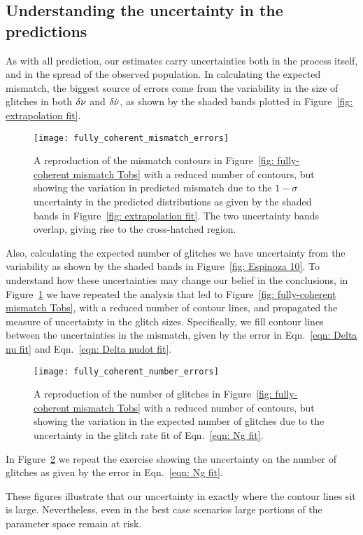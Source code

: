 \documentclass[../full_thesis/full_thesis.tex]{subfiles}
\begin{document}
\begin{subappendices}
\section{Understanding the uncertainty in the predictions}
\label{sec: uncertainties}

As with all prediction, our estimates carry uncertainties both in the process
itself, and in the spread of the observed population. In calculating the
expected mismatch, the biggest source of errors come from the variability in
the size of glitches in both $\delta\nu$ and $\delta\dot{\nu}$, as shown by the
shaded bands plotted in Figure~\ref{fig: extrapolation fit}.
\begin{figure}[htb]
\centering
\texttt{[image: fully\_coherent\_mismatch\_errors]}
\caption{A reproduction of the mismatch contours in Figure~\ref{fig:
fully-coherent mismatch Tobs} with a
reduced number of contours, but showing the variation in predicted mismatch
due to the $1-\sigma$ uncertainty in the predicted distributions as given by
the shaded bands in Figure~\ref{fig: extrapolation fit}. The two uncertainty
bands overlap, giving rise to the cross-hatched region.}
\label{fig: fully-coherent mismatch Tobs errors}
\end{figure}
Also, calculating the expected number of glitches we have
uncertainty from the variability as shown by the shaded bands in Figure~\ref{fig:
Espinoza 10}. To understand how these uncertainties may change our belief in
the conclusions, in Figure~\ref{fig: fully-coherent mismatch Tobs errors} we have
repeated the analysis that led to Figure~\ref{fig: fully-coherent mismatch Tobs},
with a reduced number of
contour lines, and propagated the measure of uncertainty in the glitch sizes.
Specifically, we fill contour lines between the uncertainties in the mismatch, given by
the error in Eqn.~\eqref{eqn: Delta nu fit} and
Eqn.~\eqref{eqn: Delta nudot fit}.
\begin{figure}[htb]
\centering
\texttt{[image: fully\_coherent\_number\_errors]}
\caption{A reproduction of the number of glitches in Figure~\ref{fig:
fully-coherent mismatch Tobs} with a
reduced number of contours, but showing the variation in the expected number
of glitches due to the uncertainty in the glitch rate fit of Eqn.~\eqref{eqn:
Ng fit}.}
\label{fig: fully-coherent number Tobs errors}
\end{figure}
In Figure~\ref{fig: fully-coherent number Tobs errors}
we repeat the exercise showing the uncertainty on the number of glitches as
given by the error in Eqn.~\eqref{eqn: Ng fit}.

These figures illustrate that our uncertainty in exactly where the contour lines
sit is large. Nevertheless, even in the best case scenarios large portions of the
parameter space remain at risk.
\end{subappendices}

\biblio
\end{document}
